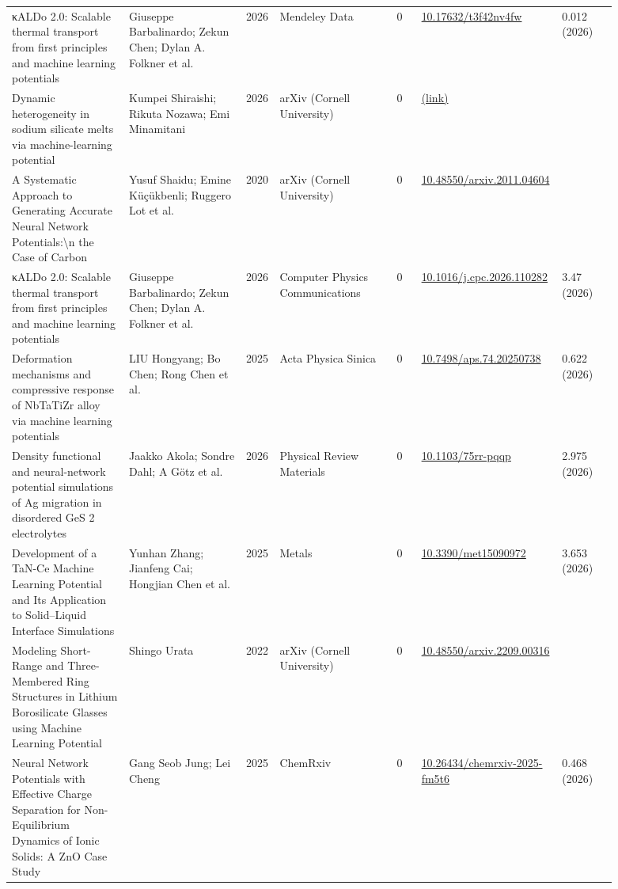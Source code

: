 \documentclass[10pt,a4paper]{article}
\begin{document}
{\begin{longtable}{p{0.192\linewidth}p{0.192\linewidth}p{0.043\linewidth}p{0.192\linewidth}p{0.043\linewidth}p{0.132\linewidth}p{0.096\linewidth}}
κALDo 2.0: Scalable thermal transport from first principles and machine learning potentials & Giuseppe Barbalinardo; Zekun Chen; Dylan A. Folkner et al. & 2026 & Mendeley Data & 0 & \href{https://doi.org/10.17632/t3f42nv4fw}{10.17632/t3f42nv4fw} & 0.012 (2026) \\
Dynamic heterogeneity in sodium silicate melts via machine-learning potential & Kumpei Shiraishi; Rikuta Nozawa; Emi Minamitani & 2026 & arXiv (Cornell University) & 0 & \href{https://openalex.org/W7166400150}{(link)} &  \\
A Systematic Approach to Generating Accurate Neural Network Potentials:\textbackslash{}n the Case of Carbon & Yusuf Shaidu; Emine Küçükbenli; Ruggero Lot et al. & 2020 & arXiv (Cornell University) & 0 & \href{https://doi.org/10.48550/arxiv.2011.04604}{10.48550/arxiv.2011.04604} &  \\
κALDo 2.0: Scalable thermal transport from first principles and machine learning potentials & Giuseppe Barbalinardo; Zekun Chen; Dylan A. Folkner et al. & 2026 & Computer Physics Communications & 0 & \href{https://doi.org/10.1016/j.cpc.2026.110282}{10.1016/j.cpc.2026.110282} & 3.47 (2026) \\
Deformation mechanisms and compressive response of NbTaTiZr alloy via machine learning potentials & LIU Hongyang; Bo Chen; Rong Chen et al. & 2025 & Acta Physica Sinica & 0 & \href{https://doi.org/10.7498/aps.74.20250738}{10.7498/aps.74.20250738} & 0.622 (2026) \\
Density functional and neural-network potential simulations of Ag migration in disordered GeS 2 electrolytes & Jaakko Akola; Sondre Dahl; A Götz et al. & 2026 & Physical Review Materials & 0 & \href{https://doi.org/10.1103/75rr-pqqp}{10.1103/75rr-pqqp} & 2.975 (2026) \\
Development of a TaN-Ce Machine Learning Potential and Its Application to Solid–Liquid Interface Simulations & Yunhan Zhang; Jianfeng Cai; Hongjian Chen et al. & 2025 & Metals & 0 & \href{https://doi.org/10.3390/met15090972}{10.3390/met15090972} & 3.653 (2026) \\
Modeling Short-Range and Three-Membered Ring Structures in Lithium Borosilicate Glasses using Machine Learning Potential & Shingo Urata & 2022 & arXiv (Cornell University) & 0 & \href{https://doi.org/10.48550/arxiv.2209.00316}{10.48550/arxiv.2209.00316} &  \\
Neural Network Potentials with Effective Charge Separation for Non-Equilibrium Dynamics of Ionic Solids: A ZnO Case Study & Gang Seob Jung; Lei Cheng & 2025 & ChemRxiv & 0 & \href{https://doi.org/10.26434/chemrxiv-2025-fm5t6}{10.26434/chemrxiv-2025-fm5t6} & 0.468 (2026) \\

\end{longtable}}
\end{document}
